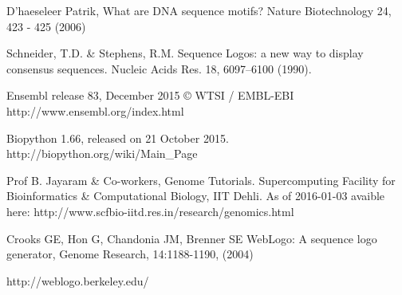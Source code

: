\documentclass[10pt,letterpaper]{article}
\begin{document}
%
%
% 
\begin{thebibliography}{10}

D'haeseleer Patrik, What are DNA sequence motifs? Nature Biotechnology 24, 423 - 425 (2006)

Schneider, T.D. \& Stephens, R.M. Sequence Logos: a new way to display consensus sequences. Nucleic Acids Res. 18, 6097–6100 (1990).

Ensembl release 83, December 2015 © WTSI / EMBL-EBI
http://www.ensembl.org/index.html

Biopython 1.66, released on 21 October 2015.
http://biopython.org/wiki/Main\_Page

Prof B. Jayaram \& Co-workers, Genome Tutorials. Supercomputing Facility for Bioinformatics \& Computational Biology, IIT Dehli.
As of 2016-01-03 avaible here:
http://www.scfbio-iitd.res.in/research/genomics.html

Crooks GE, Hon G, Chandonia JM, Brenner SE WebLogo: A sequence logo generator, Genome Research, 14:1188-1190, (2004)

http://weblogo.berkeley.edu/

\end{thebibliography}
\end{document}
